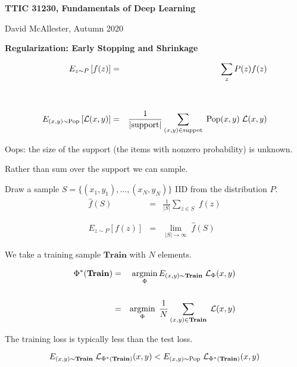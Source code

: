 





{\Huge


\centerline{\bf TTIC 31230, Fundamentals of Deep Learning}
\bigskip
\centerline{David McAllester, Autumn 2020}

\vfill
\centerline{\bf Regularization: Early Stopping and Shrinkage}
\vfill
\vfill


\begin{eqnarray*}
E_{z \sim P}\left[f(z)\right] & = & \sum_z P(z) f(z) \\
\\
\\
E_{(x,y) \sim \mathrm{Pop}}\left[{\cal L}(x,y)\right] &  = & \frac{1}{|\mathrm{support}|}\sum_{(x,y) \in \mathrm{suppot}} \;\mathrm{Pop}(x,y) \;{\cal L}(x,y)
\end{eqnarray*}

\vfill
Oops: the size of the support (the items with nonzero probability) is unknown.


\vfill
Rather than sum over the support we can sample.

\vfill
Draw a sample $S = \{(x_1,y_1),\ldots,(x_N,y_N)\}$ IID from the distribution $P$.
\vfill
\begin{eqnarray*}
\hat{f}(S) & = & \frac{1}{|S|} \sum_{z\in S}\;f(z) \\
\\
\\
E_{z \sim P}\left[f(z)\right] & = & \lim_{|S| \rightarrow \infty}\;\hat{f}(S)
\end{eqnarray*}


We take a training sample $\mathbf{Train}$ with $N$ elements.

\begin{eqnarray*}
\Phi^*(\mathbf{Train}) & = & \operatorname*{argmin}_\Phi E_{(x,y) \sim \mathbf{Train}}\;{\cal L}_\Phi(x,y) \\
\\
& = & \operatorname*{argmin}_\Phi \; \frac{1}{N} \sum_{(x,y)\in \mathbf{Train}}\; {\cal L}(x,y)
\end{eqnarray*}

\vfill
The training loss is typically less than the test loss.

\vfill
$$E_{(x,y) \sim \mathbf{Train}}\;{\cal L}_{\Phi^*(\mathbf{Train})}(x,y) < E_{(x,y) \sim \mathrm{Pop}}\; {\cal L}_{\Phi^*(\mathbf{Train})}(x,y)$$

}
